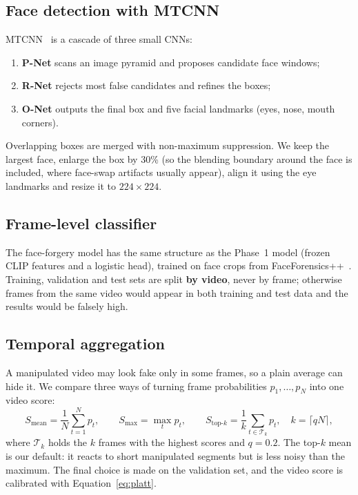 \documentclass[11pt,a4paper]{article}
\begin{document}
\subsection{Face detection with MTCNN}
MTCNN~\cite{mtcnn} is a cascade of three small CNNs:
\begin{enumerate}
  \item \textbf{P-Net} scans an image pyramid and proposes candidate face windows;
  \item \textbf{R-Net} rejects most false candidates and refines the boxes;
  \item \textbf{O-Net} outputs the final box and five facial landmarks (eyes, nose, mouth corners).
\end{enumerate}
Overlapping boxes are merged with non-maximum suppression. We keep the largest face, enlarge the
box by 30\% (so the blending boundary around the face is included, where face-swap artifacts
usually appear), align it using the eye landmarks and resize it to $224{\times}224$.

\subsection{Frame-level classifier}
The face-forgery model has the same structure as the Phase~1 model (frozen CLIP features and a
logistic head), trained on face crops from FaceForensics++~\cite{ffpp}. Training, validation and
test sets are split \textbf{by video}, never by frame; otherwise frames from the same video would
appear in both training and test data and the results would be falsely high.

\subsection{Temporal aggregation}
A manipulated video may look fake only in some frames, so a plain average can hide it. We compare
three ways of turning frame probabilities $p_1,\dots,p_N$ into one video score:
\begin{equation}
  S_{\text{mean}}=\frac{1}{N}\sum_{t=1}^{N}p_t,\qquad
  S_{\max}=\max_t p_t,\qquad
  S_{\text{top-}k}=\frac{1}{k}\sum_{t\in\mathcal{T}_k}p_t,\quad k=\lceil qN\rceil,
  \label{eq:agg}
\end{equation}
where $\mathcal{T}_k$ holds the $k$ frames with the highest scores and $q=0.2$. The top-$k$ mean
is our default: it reacts to short manipulated segments but is less noisy than the maximum. The
final choice is made on the validation set, and the video score is calibrated with
Equation~\ref{eq:platt}.
\end{document}
